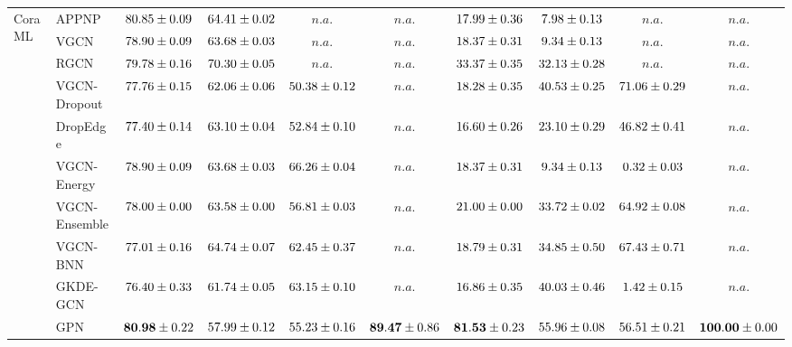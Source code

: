 \begin{table*}[!h]
{\begin{tabular}{ll|cccc|cccc}
        \multirow{10}{*}{CoraML}
        & APPNP & ${80.85\tiny \pm 0.09}$ & ${64.41\tiny \pm 0.02}$ & $n.a.$ & $n.a.$ & ${17.99\tiny \pm 0.36}$ & ${7.98\tiny \pm 0.13}$ & $n.a.$ & $n.a.$\\
        & VGCN & ${78.90\tiny \pm 0.09}$ & ${63.68\tiny \pm 0.03}$ & $n.a.$ & $n.a.$ & ${18.37\tiny \pm 0.31}$ & ${9.34\tiny \pm 0.13}$ & $n.a.$ & $n.a.$\\
        & RGCN & ${79.78\tiny \pm 0.16}$ & ${{70.30}\tiny \pm 0.05}$ & $n.a.$ & $n.a.$ & ${33.37\tiny \pm 0.35}$ & ${32.13\tiny \pm 0.28}$ & $n.a.$ & $n.a.$\\
        & VGCN-Dropout & ${77.76\tiny \pm 0.15}$ & ${62.06\tiny \pm 0.06}$ & ${50.38\tiny \pm 0.12}$ & $n.a.$ & ${18.28\tiny \pm 0.35}$ & ${40.53\tiny \pm 0.25}$ & ${{71.06}\tiny \pm 0.29}$ & $n.a.$\\
        & DropEdge & ${77.40\tiny \pm 0.14}$ & ${63.10\tiny \pm 0.04}$ & ${52.84\tiny \pm 0.10}$ & $n.a.$ & ${16.60\tiny \pm 0.26}$ & ${23.10\tiny \pm 0.29}$ & ${46.82\tiny \pm 0.41}$ & $n.a.$\\
        & VGCN-Energy & ${78.90\tiny \pm 0.09}$ & ${63.68\tiny \pm 0.03}$ & ${{66.26}\tiny \pm 0.04}$ & $n.a.$ & ${18.37\tiny \pm 0.31}$ & ${9.34\tiny \pm 0.13}$ & ${0.32\tiny \pm 0.03}$ & $n.a.$\\
        & VGCN-Ensemble & ${78.00\tiny \pm 0.00}$ & ${63.58\tiny \pm 0.00}$ & ${56.81\tiny \pm 0.03}$ & $n.a.$ & ${21.00\tiny \pm 0.00}$ & ${33.72\tiny \pm 0.02}$ & ${64.92\tiny \pm 0.08}$ & $n.a.$\\
        & VGCN-BNN & ${77.01\tiny \pm 0.16}$ & ${64.74\tiny \pm 0.07}$ & ${62.45\tiny \pm 0.37}$ & $n.a.$ & ${18.79\tiny \pm 0.31}$ & ${34.85\tiny \pm 0.50}$ & ${67.43\tiny \pm 0.71}$ & $n.a.$\\
        & GKDE-GCN & ${76.40\tiny \pm 0.33}$ & ${61.74\tiny \pm 0.05}$ & ${63.15\tiny \pm 0.10}$ & $n.a.$ & ${16.86\tiny \pm 0.35}$ & ${40.03\tiny \pm 0.46}$ & ${1.42\tiny \pm 0.15}$ & $n.a.$\\
        & GPN & ${\mathbf{80.98}\tiny \pm 0.22}$ & ${57.99\tiny \pm 0.12}$ & ${55.23\tiny \pm 0.16}$ & ${\mathbf{89.47}\tiny \pm 0.86}$ & ${\mathbf{81.53}\tiny \pm 0.23}$ & ${55.96\tiny \pm 0.08}$ & ${56.51\tiny \pm 0.21}$ & ${\mathbf{100.00}\tiny \pm 0.00}$\\


\end{tabular}}
\end{table*}
